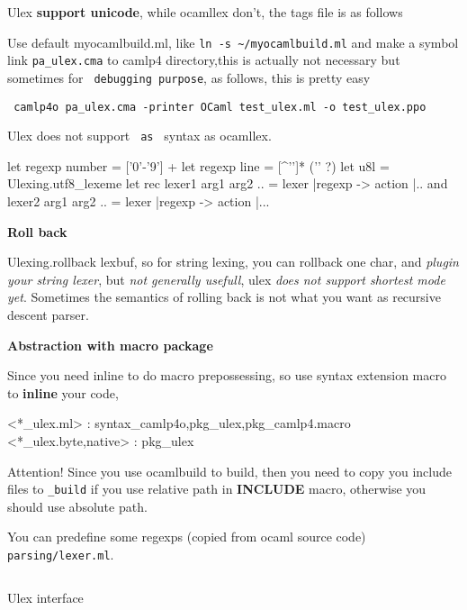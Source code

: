 
Ulex \textbf{ support unicode}, while ocamllex don't, the tags file is
as follows


Use default myocamlbuild.ml, like \verb|ln -s ~/myocamlbuild.ml| and
make a symbol link \verb|pa_ulex.cma| to camlp4 directory,this is
actually not necessary but sometimes for \verb| debugging purpose|,
as follows, this is pretty easy 

 \verb| camlp4o pa_ulex.cma -printer OCaml test_ulex.ml -o test_ulex.ppo|


Ulex does not support \verb| as | syntax as ocamllex.

\begin{ocamlcode} 
let regexp number = ['0'-'9'] + 
let regexp line = [^'\n']* ('\n' ?)  
let u8l = Ulexing.utf8_lexeme 
let rec lexer1 arg1 arg2 .. = lexer 
   |regexp -> action |..  
and lexer2 arg1 arg2 .. = lexer
   |regexp -> action |...
\end{ocamlcode}

\textbf{Roll back} 

Ulexing.rollback lexbuf, so for string lexing, you
can rollback one char, and \textit{plugin your string lexer}, but
\textit{not generally usefull}, ulex \textit{does not support shortest
mode yet}. Sometimes the semantics of rolling back is not what you
want as recursive descent parser.

\textbf{Abstraction with macro package} 

Since you need inline to do
macro prepossessing, so use syntax extension macro to \textbf{ inline}
your code,


\begin{bluetext}
 <*_ulex.ml> : syntax_camlp4o,pkg_ulex,pkg_camlp4.macro
 <*_ulex.{byte,native}> : pkg_ulex
\end{bluetext}

Attention!  Since you use ocamlbuild to build, then you need to copy
you include files to \verb|_build| if you use relative path in
\textbf{INCLUDE} macro, otherwise you should use absolute path.

 You can predefine some regexps (copied from ocaml source code)
\verb| parsing/lexer.ml|.

\inputminted[fontsize=\scriptsize, ]{ocaml}{/Users/bobzhang1988/predefine_ulex.ml}


Ulex interface

